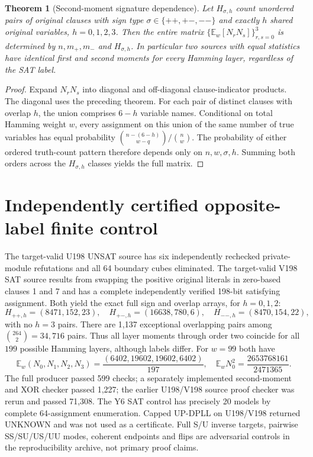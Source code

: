 \documentclass[11pt]{article}
\newtheorem{theorem}{Theorem}
\begin{document}
\begin{theorem}[Second-moment signature dependence]
Let $H_{\sigma,h}$ count unordered pairs of original clauses with sign type $\sigma\in\{++, +-, --\}$ and exactly $h$ shared original variables, $h=0,1,2,3$. Then the entire matrix $\{\mathbb E_w[N_rN_s]\}_{r,s=0}^3$ is determined by $n,m_+,m_-$ and $H_{\sigma,h}$. In particular two sources with equal statistics have identical first and second moments for every Hamming layer, regardless of the SAT label.
\end{theorem}
\begin{proof}
Expand $N_rN_s$ into diagonal and off-diagonal clause-indicator products. The diagonal uses the preceding theorem. For each pair of distinct clauses with overlap $h$, the union comprises $6-h$ variable names. Conditional on total Hamming weight $w$, every assignment on this union of the same number of true variables has equal probability $\binom{n-(6-h)}{w-q}/\binom nw$. The probability of either ordered truth-count pattern therefore depends only on $n,w,\sigma,h$. Summing both orders across the $H_{\sigma,h}$ classes yields the full matrix.
\end{proof}
\section{Independently certified opposite-label finite control}
The target-valid U198 UNSAT source has six independently rechecked private-module refutations and all 64 boundary cubes eliminated. The target-valid V198 SAT source results from swapping the positive original literals in zero-based clauses 1 and 7 and has a complete independently verified 198-bit satisfying assignment. Both yield the exact full sign and overlap arrays, for $h=0,1,2$:
\[
H_{++,h}=(8471,152,23),\quad H_{+-,h}=(16638,780,6),\quad
H_{--,h}=(8470,154,22),
\]
with no $h=3$ pairs. There are 1,137 exceptional overlapping pairs among $\binom{264}{2}=34,716$ pairs. Thus all layer moments through order two coincide for all $199$ possible Hamming layers, although labels differ. For $w=99$ both have
\[
\mathbb E_w(N_0,N_1,N_2,N_3)=\frac{(6402,19602,19602,6402)}{197},
\quad\mathbb E_wN_0^2=\frac{2653768161}{2471365}.
\]
The full producer passed 599 checks; a separately implemented second-moment and XOR checker passed 1,227; the earlier U198/V198 source proof checker was rerun and passed 71,308. The Y6 SAT control has precisely 20 models by complete 64-assignment enumeration. Capped UP-DPLL on U198/V198 returned UNKNOWN and was not used as a certificate. Full S/U inverse targets, pairwise SS/SU/US/UU modes, coherent endpoints and flips are adversarial controls in the reproducibility archive, not primary proof claims.
\end{document}
